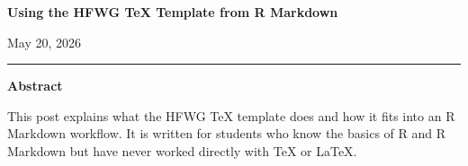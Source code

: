 \documentclass[12pt]{article}
\newif\ifhfwganon
\begin{document}
\begin{titlepage}
\thispagestyle{empty}
\vspace*{0.12\textheight}
\begin{center}
\begin{singlespace}

{\LARGE\bfseries Using the HFWG TeX Template from R
Markdown\par}


\vspace{2.2em}

\hfwgauthorblock

\par\vspace{1.5\baselineskip}
\hfwgseriesblock

\ifhfwganon\else
\vspace{0.35em}
{\small May 20, 2026}\par
\fi

\vspace{2.2\baselineskip}
\noindent\rule{0.35\textwidth}{0.4pt}\par
\vspace{0.65em}
\begin{minipage}{0.78\textwidth}
\small\singlespacing
\textbf{Abstract}\par\vspace{0.3em}
This post explains what the HFWG TeX template does and how it fits into
an R Markdown workflow. It is written for students who know the basics
of R and R Markdown but have never worked directly with TeX or LaTeX.
\end{minipage}

\end{singlespace}
\end{center}
\vfill
\end{titlepage}
\else
\end{document}
